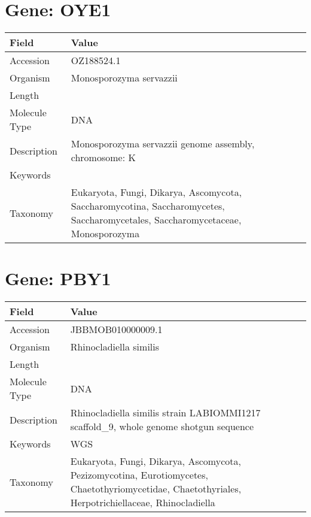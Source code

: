 \documentclass[10pt]{article}
\begin{document}
\section*{Gene: OYE1}
{\footnotesize
\begin{longtable}{>{\raggedright\arraybackslash}p{4.5cm} >{\raggedright\arraybackslash}p{11.5cm}}
\textbf{Field} & \textbf{Value} \\
\hline
Accession & OZ188524.1 \\
Organism & Monosporozyma servazzii \\
Length & 1040374 \\
Molecule Type & DNA \\
Description & Monosporozyma servazzii genome assembly, chromosome: K \\
Keywords &  \\
Taxonomy & Eukaryota, Fungi, Dikarya, Ascomycota, Saccharomycotina, Saccharomycetes, Saccharomycetales, Saccharomycetaceae, Monosporozyma \\
\end{longtable}
}


\section*{Gene: PBY1}
{\footnotesize
\begin{longtable}{>{\raggedright\arraybackslash}p{4.5cm} >{\raggedright\arraybackslash}p{11.5cm}}
\textbf{Field} & \textbf{Value} \\
\hline
Accession & JBBMOB010000009.1 \\
Organism & Rhinocladiella similis \\
Length & 1267032 \\
Molecule Type & DNA \\
Description & Rhinocladiella similis strain LABIOMMI1217 scaffold\_9, whole genome shotgun sequence \\
Keywords & WGS \\
Taxonomy & Eukaryota, Fungi, Dikarya, Ascomycota, Pezizomycotina, Eurotiomycetes, Chaetothyriomycetidae, Chaetothyriales, Herpotrichiellaceae, Rhinocladiella \\
\end{longtable}
}
\end{document}
